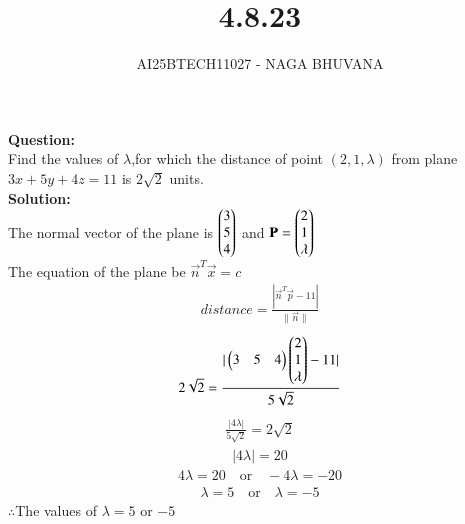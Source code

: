 \documentclass[journal,12pt,onecolumn]{IEEEtran}
\begin{document}
\title{4.8.23}
\author{AI25BTECH11027 - NAGA BHUVANA}
{\let\newpage\relax\maketitle}
\noindent
		\textbf{Question:}\\
Find the values of $\lambda$,for which the distance of point $(2,1,\lambda)$ from plane $3x+5y+4z=11$ is $2\sqrt{2}$ units.\\
\textbf{Solution:}\\
The normal vector of the plane is $\begin{pmatrix}3\\5\\4\end{pmatrix}$ and $\mathbf{P}=\begin{pmatrix}2\\1\\\lambda\end{pmatrix}$\\
The equation of the plane be $\vec{n}^T\vec{x}=c$
\begin{align}
    distance=\frac{|\vec{n}^T\vec{p}-11|}{\|\vec{n}\|}
\end{align}
\begin{align}
    2\sqrt{2}=\frac{|\begin{pmatrix}3&5&4\end{pmatrix}\begin{pmatrix}2\\1\\\lambda\end{pmatrix}-11|}{5\sqrt{2}}
\end{align}
        \begin{align}
            \frac{|4\lambda|}{5\sqrt{2}}=2\sqrt{2}
        \end{align}
        \begin{align}
            |4\lambda|=20
        \end{align}
        \begin{align}
            4\lambda=20  \quad \text{or} \quad -4\lambda=-20
        \end{align}
        \begin{align}
            \lambda=5 \quad \text{or} \quad \lambda=-5
        \end{align}
        $\therefore $The values of $\lambda=5$ or $-5$
\end{document}

